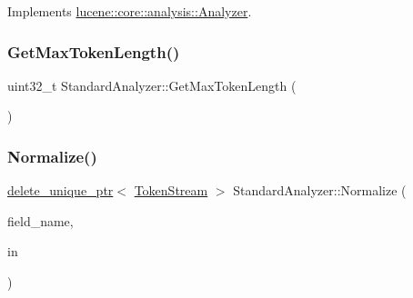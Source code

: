 Implements \mbox{\hyperlink{classlucene_1_1core_1_1analysis_1_1Analyzer_a9b7dc3c598057fbf4e9b5f48066cb54a}{lucene\+::core\+::analysis\+::\+Analyzer}}.

\mbox{\label{classlucene_1_1core_1_1analysis_1_1standard_1_1StandardAnalyzer_a383601d5fa0bcd3883f794c887512517}} 
\subsubsection{\texorpdfstring{Get\+Max\+Token\+Length()}{GetMaxTokenLength()}}
{\footnotesize\ttfamily uint32\+\_\+t Standard\+Analyzer\+::\+Get\+Max\+Token\+Length (\begin{DoxyParamCaption}{ }\end{DoxyParamCaption})}

\mbox{\label{classlucene_1_1core_1_1analysis_1_1standard_1_1StandardAnalyzer_aa42382c6504229a195abbc25f048a614}} 
\subsubsection{\texorpdfstring{Normalize()}{Normalize()}}
{\footnotesize\ttfamily \mbox{\hyperlink{namespacelucene_1_1core_1_1analysis_a1ecb3e92b19c3afd8060d81a437a7a3b}{delete\+\_\+unique\+\_\+ptr}}$<$ \mbox{\hyperlink{classlucene_1_1core_1_1analysis_1_1TokenStream}{Token\+Stream}} $>$ Standard\+Analyzer\+::\+Normalize (\begin{DoxyParamCaption}\item[{const std\+::string \&}]{field\+\_\+name,  }\item[{\mbox{\hyperlink{namespacelucene_1_1core_1_1analysis_a1ecb3e92b19c3afd8060d81a437a7a3b}{delete\+\_\+unique\+\_\+ptr}}$<$ \mbox{\hyperlink{classlucene_1_1core_1_1analysis_1_1TokenStream}{Token\+Stream}} $>$}]{in }\end{DoxyParamCaption})\hspace{0.3cm}{\ttfamily [protected]}}

